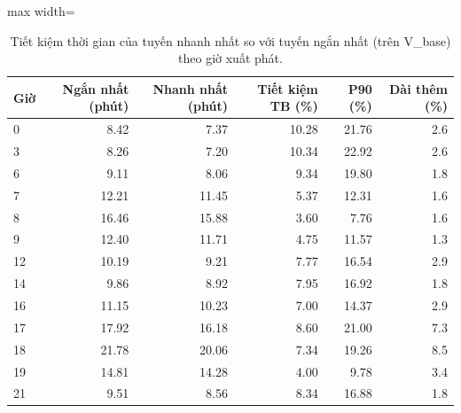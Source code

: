 \begin{table}[!htbp]
\centering
\small
\caption{Tiết kiệm thời gian của tuyến nhanh nhất so với tuyến ngắn nhất (trên V\_base) theo giờ xuất phát.}
\label{tab:tab_saving_by_hour}
\begin{adjustbox}{max width=\linewidth}
\begin{tabular}{lrrrrr}
\toprule
Giờ & Ngắn nhất (phút) & Nhanh nhất (phút) & Tiết kiệm TB (\%) & P90 (\%) & Dài thêm (\%) \\
\midrule
0 & 8.42 & 7.37 & 10.28 & 21.76 & 2.6 \\
3 & 8.26 & 7.20 & 10.34 & 22.92 & 2.6 \\
6 & 9.11 & 8.06 & 9.34 & 19.80 & 1.8 \\
7 & 12.21 & 11.45 & 5.37 & 12.31 & 1.6 \\
8 & 16.46 & 15.88 & 3.60 & 7.76 & 1.6 \\
9 & 12.40 & 11.71 & 4.75 & 11.57 & 1.3 \\
12 & 10.19 & 9.21 & 7.77 & 16.54 & 2.9 \\
14 & 9.86 & 8.92 & 7.95 & 16.92 & 1.8 \\
16 & 11.15 & 10.23 & 7.00 & 14.37 & 2.9 \\
17 & 17.92 & 16.18 & 8.60 & 21.00 & 7.3 \\
18 & 21.78 & 20.06 & 7.34 & 19.26 & 8.5 \\
19 & 14.81 & 14.28 & 4.00 & 9.78 & 3.4 \\
21 & 9.51 & 8.56 & 8.34 & 16.88 & 1.8 \\
\bottomrule
\end{tabular}
\end{adjustbox}
\end{table}
